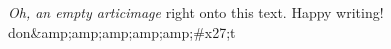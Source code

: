 \textit{Oh, an empty articimage} right onto this text. Happy writing! 
don&amp;amp;amp;amp;amp;#x27;t